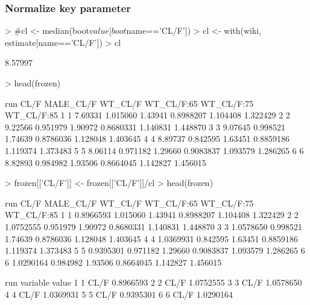 \subsubsection{Normalize key parameter}
\begin{Schunk}
\begin{Sinput}
> #cl <- median(boot$value[boot$name=='CL/F'])
> cl <- with(wiki, estimate[name=='CL/F'])
> cl
\end{Sinput}
\begin{Soutput}
[1] 8.57997
\end{Soutput}
\begin{Sinput}
> head(frozen)
\end{Sinput}
\begin{Soutput}
  run    CL/F MALE_CL/F WT_CL/F WT_CL/F:65 WT_CL/F:75 WT_CL/F:85
1   1 7.69331  1.015060 1.43941  0.8988207   1.104408   1.322429
2   2 9.22566  0.951979 1.90972  0.8680331   1.140831   1.448870
3   3 9.07645  0.998521 1.74639  0.8786036   1.128048   1.403645
4   4 8.89737  0.842595 1.63451  0.8859186   1.119374   1.373483
5   5 8.06114  0.971182 1.29660  0.9083837   1.093579   1.286265
6   6 8.82893  0.984982 1.93506  0.8664045   1.142827   1.456015
\end{Soutput}
\begin{Sinput}
> frozen[['CL/F']] <- frozen[['CL/F']]/cl
> head(frozen)
\end{Sinput}
\begin{Soutput}
  run      CL/F MALE_CL/F WT_CL/F WT_CL/F:65 WT_CL/F:75 WT_CL/F:85
1   1 0.8966593  1.015060 1.43941  0.8988207   1.104408   1.322429
2   2 1.0752555  0.951979 1.90972  0.8680331   1.140831   1.448870
3   3 1.0578650  0.998521 1.74639  0.8786036   1.128048   1.403645
4   4 1.0369931  0.842595 1.63451  0.8859186   1.119374   1.373483
5   5 0.9395301  0.971182 1.29660  0.9083837   1.093579   1.286265
6   6 1.0290164  0.984982 1.93506  0.8664045   1.142827   1.456015
\end{Soutput}
\begin{Soutput}
  run variable     value
1   1     CL/F 0.8966593
2   2     CL/F 1.0752555
3   3     CL/F 1.0578650
4   4     CL/F 1.0369931
5   5     CL/F 0.9395301
6   6     CL/F 1.0290164
\end{Soutput}
\end{Schunk}
